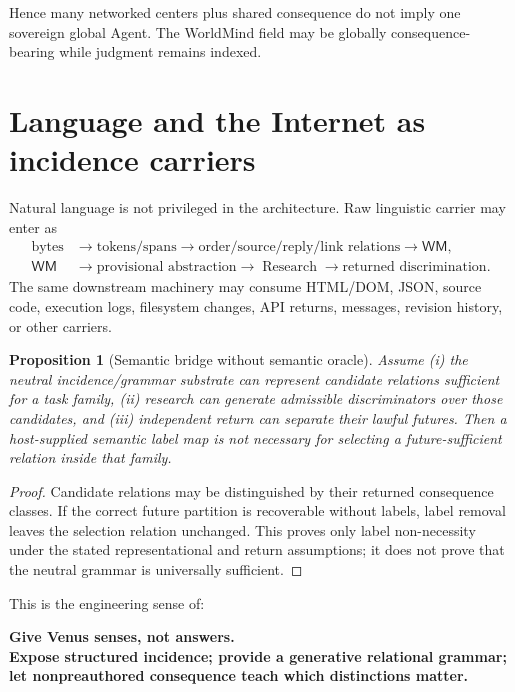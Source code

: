 \documentclass[10pt]{article}
\theoremstyle{venus}
\newtheorem{proposition}[theorem]{Proposition}
\theoremstyle{definition}
\newcommand{\Research}{\operatorname{Research}}
\newcommand{\WM}{\mathsf{WM}}
\begin{document}
Hence many networked centers plus shared consequence do not imply one sovereign
global Agent. The WorldMind field may be globally consequence-bearing while
judgment remains indexed.

\section{Language and the Internet as incidence carriers}

Natural language is not privileged in the architecture. Raw linguistic carrier
may enter as
\[
\begin{aligned}
\text{bytes}&\to\text{tokens/spans}
\to\text{order/source/reply/link relations}
\to\WM,\\
\WM&\to\text{provisional abstraction}
\to\Research
\to\text{returned discrimination}.
\end{aligned}
\]
The same downstream machinery may consume HTML/DOM, JSON, source code,
execution logs, filesystem changes, API returns, messages, revision history, or
other carriers.

\begin{proposition}[Semantic bridge without semantic oracle]
Assume (i) the neutral incidence/grammar substrate can represent candidate
relations sufficient for a task family, (ii) research can generate admissible
discriminators over those candidates, and (iii) independent return can
separate their lawful futures. Then a host-supplied semantic label map is not
necessary for selecting a future-sufficient relation inside that family.
\end{proposition}
\begin{proof}
Candidate relations may be distinguished by their returned consequence classes.
If the correct future partition is recoverable without labels, label removal
leaves the selection relation unchanged. This proves only label non-necessity
under the stated representational and return assumptions; it does not prove
that the neutral grammar is universally sufficient.
\end{proof}

This is the engineering sense of:
\begin{center}
\bfseries
Give Venus senses, not answers.\\
Expose structured incidence; provide a generative relational grammar;\\
let nonpreauthored consequence teach which distinctions matter.
\end{center}
\end{document}
